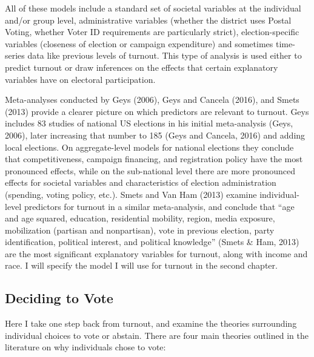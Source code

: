 \documentclass[12pt,twoside]{reedthesis}
\begin{document}
  All of these models include a standard set of societal variables at the
  individual and/or group level, administrative variables (whether the
  district uses Postal Voting, whether Voter ID requirements are
  particularly strict), election-specific variables (closeness of election
  or campaign expenditure) and sometimes time-series data like previous
  levels of turnout. This type of analysis is used either to predict
  turnout or draw inferences on the effects that certain explanatory
  variables have on electoral participation.
  
  Meta-analyses conducted by Geys (2006), Geys and Cancela (2016), and
  Smets (2013) provide a clearer picture on which predictors are relevant
  to turnout. Geys includes 83 studies of national US elections in his
  initial meta-analysis (Geys, 2006), later increasing that number to 185
  (Geys and Cancela, 2016) and adding local elections. On aggregate-level
  models for national elections they conclude that competitiveness,
  campaign financing, and registration policy have the most pronounced
  effects, while on the sub-national level there are more pronounced
  effects for societal variables and characteristics of election
  administration (spending, voting policy, etc.). Smets and Van Ham (2013)
  examine individual-level predictors for turnout in a similar
  meta-analysis, and conclude that ``age and age squared, education,
  residential mobility, region, media exposure, mobilization (partisan and
  nonpartisan), vote in previous election, party identification, political
  interest, and political knowledge'' (Smets \& Ham, 2013) are the most
  significant explanatory variables for turnout, along with income and
  race. I will specify the model I will use for turnout in the second
  chapter.
  
  \subsection{Deciding to Vote}\label{deciding-to-vote}
  
  Here I take one step back from turnout, and examine the theories
  surrounding individual choices to vote or abstain. There are four main
  theories outlined in the literature on why individuals chose to vote:
  
\end{document}
